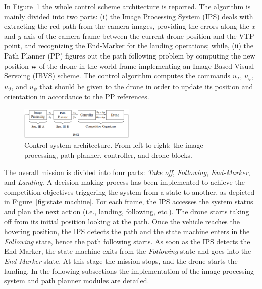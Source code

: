 \documentclass[a4paper,twocolumn,10pt]{article}
\begin{document}
    In Figure~\ref{fig:block diagram} the whole control scheme architecture is reported. The algorithm is mainly divided into two parts: (i) the Image Processing System (IPS) deals with extracting the red path from the 
    camera images, providing the errors along the $x$- and $y$-axis of the camera frame between the current drone position and the VTP point, and recognizing the End-Marker for the landing operations; while, (ii) the Path Planner (PP) figures out the path following problem by computing the new 
    position $\mathbf{w}$ of the drone in the world frame\cite[Sec.~V]{SilanoMATFly} implementing 
    an Image-Based Visual Servoing (IBVS) scheme. The control algorithm computes the commands $u_T$, $u_\varphi$, $u_\vartheta$, and $u_\psi$ that should be given to the drone in order to update its position and orientation in accordance to the PP references. 

    \begin{figure}
        \centering
        \includegraphics[width=0.49\textwidth]{pics/fig4_frick.png}
        \caption{Control system architecture. From left to right: the image processing, path planner, 
        controller, and drone blocks.}
        \label{fig:block diagram}
    \end{figure}

    The overall mission is divided into four parts: \textit{Take off}, \textit{Following}, \textit{End-Marker}, and \textit{Landing}. A decision-making process has been implemented to  achieve the competition objectives triggering the system from a state to another, as depicted in 
    Figure~\ref{fig:state machine}. For each frame, the IPS accesses the system status and plan the next action (i.e., landing, following, etc.). The drone starts taking off from its initial position looking at the path. Once the vehicle reaches the hovering position, the IPS detects the path and the state machine enters in the \textit{Following} state, hence the path following starts. As soon as the IPS detects the End-Marker, the state machine exits from the \textit{Following} state and goes into the \textit{End-Marker} state. At this stage the mission stops, and the drone starts the landing. In the following subsections the implementation of the image processing system and path planner modules are detailed.
\end{document}
